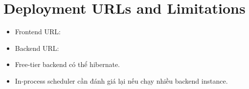 \section{Deployment URLs and Limitations}


\begin{itemize}
  \item Frontend URL: \texttt{\FrontendURL}
  \item Backend URL: \texttt{\BackendURL}
  \item Free-tier backend có thể hibernate.
  \item In-process scheduler cần đánh giá lại nếu chạy nhiều backend instance.
\end{itemize}
